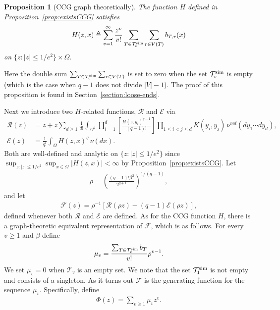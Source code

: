 \documentclass[12pt]{article}
\newtheorem{proposition}[theorem]{Proposition}
\newcommand{\cE}{\mathcal{E}}
\newcommand{\cR}{\mathcal{R}}
\newcommand{\cT}{\mathcal{T}}
\begin{document}
\begin{proposition}[CCG graph theoretically]\label{prop:CCG-graph-theoretically}
The function $H$ defined in Proposition~\ref{prop:existsCCG} satisfies
\begin{align}
 H(z,x)\triangleq 
\sum_{v=1}^\infty \frac{z^v}{v!}
    \sum_{T\in\cT_v^{\rm sim}} \sum_{r\in V(T)} b_{T,r}(x) \label{eq:H-as-tree-sum}
\end{align}
on $\{z: |z|\le 1/e^2\}\times \Omega$.
\end{proposition}
Here the  double sum  $\sum_{T\in\cT_v^{\rm sim}} \sum_{r\in V(T)}$ is set to zero  when the set $\cT_v^{\rm sim}$ 
is empty (which is the case when $q-1$ does not divide $|V|-1$).
The proof of this proposition is found in Section~\ref{section:loose-ends}.

Next we introduce two $H$-related functions, $\cR$ and $\cE$ via
\begin{align}
    \cR(z)
    &=
    z+z \sum_{d\geq 1}\frac{1}{d!}
    \int_{\Omega^d}
    \prod_{i=1}^d
    \left[
        \frac{H(z,y_i)^{q-1}}{(q-1)!}
    \right]
    \prod_{1\leq i<j\leq d} K(y_i,y_j)\,
    \nu^{\otimes d}(dy_1\cdots dy_d), \label{eq:Rdef}\\
    \cE(z)
    &=
    \frac{1}{q!}\int_{\Omega} H(z,x)^q\,\nu(dx). \label{eq:Edef}
\end{align}
Both are well-defined and analytic  on $\{z: |z|\le 1/e^2\}$ since $\sup_{z: |z|\le 1/e^2}\sup_{x\in \Omega}|H(z,x)|<\infty$ by Proposition~\ref{prop:existsCCG}. Let
 \begin{align*}
        \rho = \left(\frac{(q-1)!\beta^2}{2^{q+1}}\right)^{1/(q-1)},
    \end{align*}
and let
\begin{align*}
\mathcal{F}(z)=\rho^{-1}\left[\cR(\rho z) - (q-1)\cE(\rho z)\right], 
\end{align*}   
defined whenever both $\cR$ and $\cE$ are defined. 
As for the CCG function $H$, there is a graph-theoretic equivalent representation of $\mathcal{F}$, which 
is as follows.  For every $v\ge 1$ and $\beta$ define
\begin{align}\label{eq:mu-0}
    \mu_{v} = \frac{\sum_{T\in\cT_{v}^{\rm sim}} b_T}{v!} \rho^{v-1}.
\end{align}
We set $\mu_v=0$ when $\cT_v$ is an empty set.
We note that the set $\cT_1^{\rm sim}$ is not empty and consists of a singleton.
As it turns out $\mathcal{F}$ is the generating function for the sequence $\mu_v$. Specifically, define
\begin{align}
\Phi(z) = \sum_{v\ge 1} \mu_{v} z^v. \label{eq:Phi}
\end{align}
\end{document}
